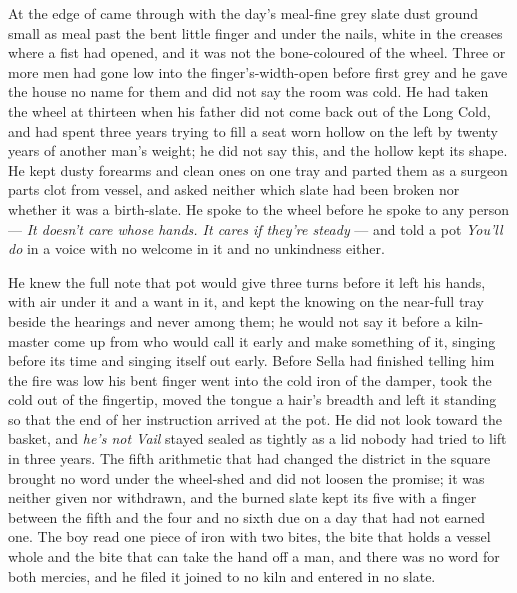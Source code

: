 At the edge of   came through with the day's meal-fine grey slate dust ground small as meal past the bent little finger and under the nails, white in the creases where a fist had opened, and it was not the bone-coloured  of the wheel. Three or more men had gone low into the finger's-width-open  before first grey and he gave the house no name for them and did not say the room was cold. He had taken the wheel at thirteen when his father did not come back out of the Long Cold, and had spent three years trying to fill a seat worn hollow on the left by twenty years of another man's weight; he did not say this, and the hollow kept its shape. He kept dusty forearms and clean ones on one tray and parted them as a surgeon parts clot from vessel, and asked neither which slate had been broken nor whether it was a birth-slate. He spoke to the wheel before he spoke to any person --- \emph{It doesn't care whose hands. It cares if they're steady} --- and told a pot \emph{You'll do} in a voice with no welcome in it and no unkindness either.

He knew the full note that pot would give three turns before it left his hands, with air under it and a want in it, and kept the knowing on the near-full tray beside the hearings and never among them; he would not say it before a kiln-master come up from  who would call it early and make something of it, singing before its time and singing itself out early. Before Sella had finished telling him the fire was low his bent finger went into the cold iron of the damper, took the cold out of the fingertip, moved the tongue a hair's breadth and left it standing so that the end of her instruction arrived at the pot. He did not look toward the basket, and \emph{he's not Vail} stayed sealed as tightly as a lid nobody had tried to lift in three years. The fifth arithmetic that had changed the district in the square brought no word under the wheel-shed and did not loosen the promise; it was neither given nor withdrawn, and the burned slate kept its five with a finger between the fifth and the four and no sixth due on a day that had not earned one. The boy read one piece of iron with two bites, the bite that holds a vessel whole and the bite that can take the hand off a man, and there was no  word for both mercies, and he filed it joined to no kiln and entered in no slate.

\scenebreak

